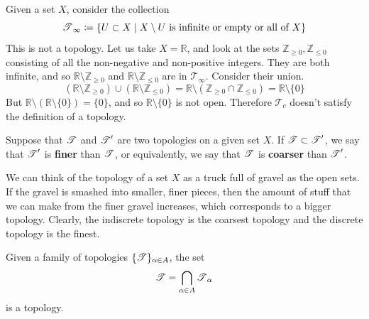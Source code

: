   \begin{example}
    \label{ex:countable-complement-is-not-a-topology}
    Given a set $X$, consider the collection 
    \begin{equation}
      \operatorname{\mathscr{T}}_\infty \coloneqq \{U \subset X \mid X \setminus U \text{ is infinite or empty or all of }X \}
    \end{equation}
    This is not a topology. Let us take $X = \mathbb{R}$, and look at the sets $\mathbb{Z}_{\geq 0}, \mathbb{Z}_{\leq 0}$ consisting of all the non-negative and non-positive integers. They are both infinite, and so $\mathbb{R} \setminus \mathbb{Z}_{\geq 0}$ and $\mathbb{R} \setminus \mathbb{Z}_{\leq 0}$ are in $\mathcal{T}_\infty$. Consider their union. 
    \begin{equation}
      (\mathbb{R} \setminus \mathbb{Z}_{\geq 0}) \cup (\mathbb{R} \setminus \mathbb{Z}_{\leq 0}) = \mathbb{R} \setminus (\mathbb{Z}_{\geq 0} \cap \mathbb{Z}_{\leq 0}) = \mathbb{R} \setminus \{0\}
    \end{equation}
    But $\mathbb{R} \setminus (\mathbb{R} \setminus \{0\}) = \{0\}$, and so $\mathbb{R} \setminus \{0\}$ is not open. Therefore $\mathcal{T}_c$ doesn't satisfy the definition of a topology. 
  \end{example}


  \begin{definition}
    \label{def:finer-coarser-topologies}
    Suppose that $\operatorname{\mathscr{T}}$ and $\operatorname{\mathscr{T}}^\prime$ are two topologies on a given set $X$. If $\operatorname{\mathscr{T}} \subset \operatorname{\mathscr{T}}^\prime$, we say that $\operatorname{\mathscr{T}}^\prime$ is \textbf{finer} than $\operatorname{\mathscr{T}}$, or equivalently, we say that $\operatorname{\mathscr{T}}$ is \textbf{coarser} than $\operatorname{\mathscr{T}}^\prime$. 
  \end{definition}

  We can think of the topology of a set $X$ as a truck full of gravel as the open sets. If the gravel is smashed into smaller, finer pieces, then the amount of stuff that we can make from the finer gravel increases, which corresponds to a bigger topology. Clearly, the indiscrete topology is the coarsest topology and the discrete topology is the finest. 

  \begin{theorem}
    \label{thm:intersection-of-topologies}
    Given a family of topologies $\{\operatorname{\mathscr{T}}\}_{\alpha \in A}$, the set 
    \begin{equation}
      \operatorname{\mathscr{T}} = \bigcap_{\alpha \in A} \operatorname{\mathscr{T}}_\alpha
    \end{equation}
    is a topology. 
  \end{theorem}

